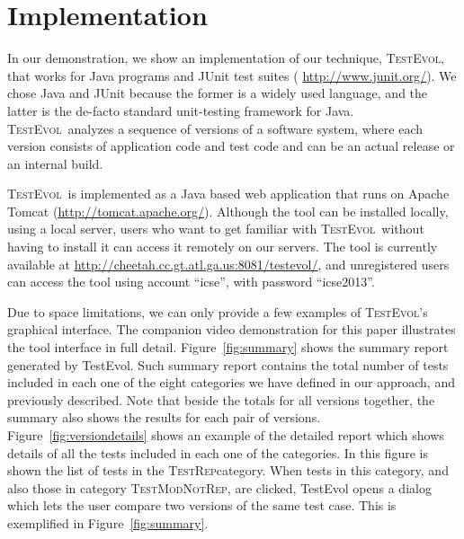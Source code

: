 \documentclass[conference]{IEEEtran}
\newcommand{\lang}[1]{\texttt{\small #1}}
\newcommand{\catrep}{\textsc{TestRep}}
\newcommand{\catref}{\textsc{TestModNotRep}}
\newcommand{\tool}{\textsc{TestEvol}\xspace}
\begin{document}


\section{Implementation}
\label{sec:implementation}


In our demonstration, we show an implementation of our technique,
\tool, that works for Java programs and JUnit test suites ({\small
  \url{http://www.junit.org/}}). We chose Java and JUnit because the
former is a widely used language, and the latter is the de-facto
standard unit-testing framework for Java.  \tool\ analyzes a sequence
of versions of a software system, where each version consists of
application code and test code and can be an actual release or an
internal build.

\tool\ is implemented as a Java based web application that runs on
Apache Tomcat ({\small \url{http://tomcat.apache.org/}}). Although the
tool can be installed locally, using a local server, users who want to
get familiar with \tool\ without having to install it can access it
remotely on our servers. The tool is currently available at {\small
  \url{http://cheetah.cc.gt.atl.ga.us:8081/testevol/}}, and
unregistered users can access the tool using account ``icse'', with
password ``icse2013''.

Due to space limitations, we can only provide a few examples of
\tool's graphical interface. The companion video demonstration for
this paper illustrates the tool interface in full detail. Figure~\ref{fig:summary}
shows the summary report generated by TestEvol. Such summary report
contains the total number of tests included in each one of the eight
categories we have defined in our approach, and previously described.
Note that beside the totals for all versions together, the summary also 
shows the results for each pair of versions. Figure~\ref{fig:versiondetails}
shows an example of the detailed report which shows details of all the tests
included in each one of the categories. In this figure is shown the list of
tests in the \catrep category. When tests in this category, and also those in
category \catref, are clicked, TestEvol opens a dialog which lets
the user compare two versions of the same test case. This is exemplified in Figure~\ref{fig:summary}.
\end{document}
